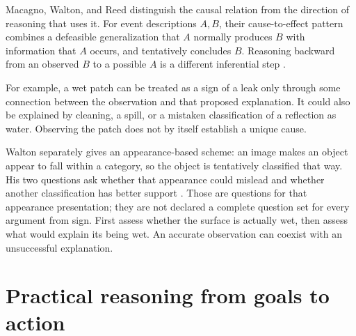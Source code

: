 Macagno, Walton, and Reed distinguish the causal relation from the
direction of reasoning that uses it. For event descriptions \(A,B\),
their cause-to-effect pattern combines a defeasible generalization
that \(A\) normally produces \(B\)
with information that \(A\) occurs, and tentatively concludes \(B\).
Reasoning backward from an observed \(B\) to a possible \(A\) is a
different inferential step
\cite[pp.~2495--2496]{MacagnoWaltonReed2017Schemes}.

For example, a wet patch can be treated as a sign of a leak only through
some connection between the observation and that proposed explanation.
It could also be explained by cleaning, a spill, or a mistaken
classification of a reflection as water. Observing the patch does
not by itself establish a unique cause.

Walton separately gives an appearance-based scheme: an image makes
an object appear to fall within a category, so the object is tentatively
classified that way. His two questions ask whether that appearance
could mislead and whether another classification has better support
\cite[pp.~27--31]{Walton2016ArgumentEvaluation}.
Those are questions for that appearance presentation; they are not
declared a complete question set for every argument from sign.
First assess whether the surface is actually wet, then assess what
would explain its being wet. An accurate observation can coexist
with an unsuccessful explanation.

\section{Practical reasoning from goals to action}
\label{sec:p18-scheme-practical}


